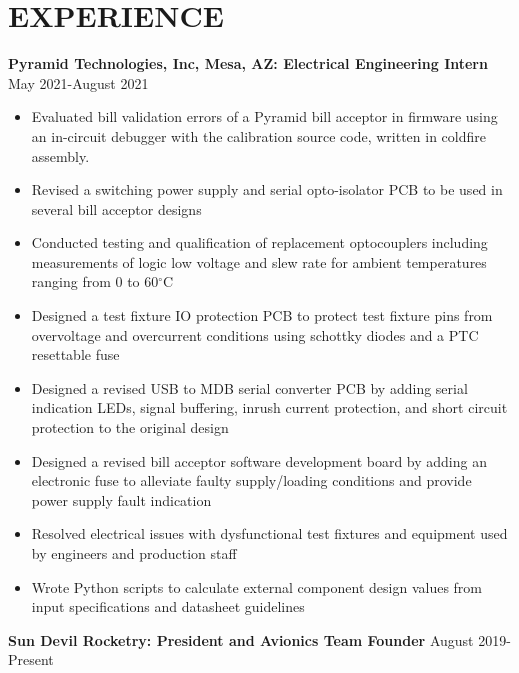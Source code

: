 \documentclass{article}
\begin{document}
\section{EXPERIENCE}
\textbf{Pyramid Technologies, Inc, Mesa, AZ: Electrical Engineering Intern}
\hfill 
\vspace{0.5em}
May 2021-August 2021
\begin{itemize}
\item{Evaluated bill validation errors of a Pyramid bill acceptor in firmware using an in-circuit debugger with the calibration source code, written in coldfire     assembly.}
\item{Revised a switching power supply and serial opto-isolator PCB to be used in several bill acceptor designs}
\item{Conducted testing and qualification of replacement optocouplers including measurements of logic low voltage and slew rate for ambient temperatures ranging from 0 to 60$^{\circ}$C}
\item{Designed a test fixture IO protection PCB to protect test fixture pins from overvoltage and overcurrent conditions using schottky diodes and a PTC resettable fuse}
\item{Designed a revised USB to MDB serial converter PCB by adding serial indication LEDs, signal buffering, inrush current protection, and short circuit protection to the original design}
\item{Designed a revised bill acceptor software development board by adding an electronic fuse to alleviate faulty supply/loading conditions and provide power supply fault indication}
\item{Resolved electrical issues with dysfunctional test fixtures and equipment used by engineers and production staff}
\item{Wrote Python scripts to calculate external component design values from input specifications and datasheet guidelines}
\end{itemize}
\vspace{1em}
\textbf{Sun Devil Rocketry: President and Avionics Team Founder}
\hfill
\vspace{0.5em}
August 2019-Present
\end{document}
